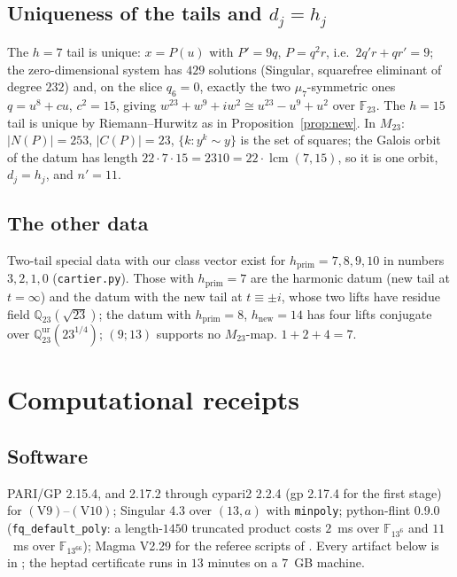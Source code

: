 \documentclass[11pt]{amsart}
\newcommand{\QQ}{\mathbb{Q}}
\newcommand{\FF}{\mathbb{F}}
\newcommand{\Mtw}{M_{23}}
\theoremstyle{plain}
\theoremstyle{definition}
\begin{document}
\subsection*{Uniqueness of the tails and $d_j=h_j$}
The $h=7$ tail is unique: $x=P(u)$ with $P'=9q$, $P=q^2r$, i.e.\
$2q'r+qr'=9$; the zero-dimensional system has $429$ solutions (Singular,
squarefree eliminant of degree $232$) and, on the slice $q_6=0$, exactly
the two $\mu_7$-symmetric ones $q=u^8+cu$, $c^2=15$, giving
$w^{23}+w^9+iw^2\cong u^{23}-u^9+u^2$ over $\FF_{23}$. The $h=15$ tail
is unique by Riemann--Hurwitz as in Proposition~\ref{prop:new}. In
$\Mtw$: $|N(P)|=253$, $|C(P)|=23$, $\{k:y^k\sim y\}$ is the set of
squares; the Galois orbit of the datum has length $22\cdot7\cdot15=2310
=22\cdot\operatorname{lcm}(7,15)$, so it is one orbit, $d_j=h_j$, and
$n'=11$.

\subsection*{The other data}
Two-tail special data with our class vector exist for
$h_{\mathrm{prim}}=7,8,9,10$ in numbers $3,2,1,0$ (\texttt{cartier.py}).
Those with $h_{\mathrm{prim}}=7$ are the harmonic datum (new tail at
$t=\infty$) and the datum with the new tail at $t\equiv\pm i$, whose
two lifts have residue field $\QQ_{23}(\sqrt{23})$; the datum with
$h_{\mathrm{prim}}=8$, $h_{\mathrm{new}}=14$ has four lifts conjugate
over $\QQ_{23}^{\mathrm{ur}}(23^{1/4})$; $(9;13)$ supports no
$\Mtw$-map. $1+2+4=7$.

\section{Computational receipts}\label{app:receipts}

\subsection*{Software}
PARI/GP 2.15.4, and 2.17.2 through cypari2 2.2.4 (gp 2.17.4 for the first
stage) for $(\mathrm V9)$--$(\mathrm V10)$; Singular 4.3 over $(13,a)$ with \texttt{minpoly};
python-flint 0.9.0 (\texttt{fq\_default\_poly}: a length-$1450$
truncated product costs $2$~ms over $\FF_{13^6}$ and $11$~ms over
$\FF_{13^{66}}$); Magma V2.29 for the referee scripts of \cite{seven}.
Every artifact below is in \cite{receipts}; the heptad certificate runs
in $13$ minutes on a $7$~GB machine.
\end{document}
